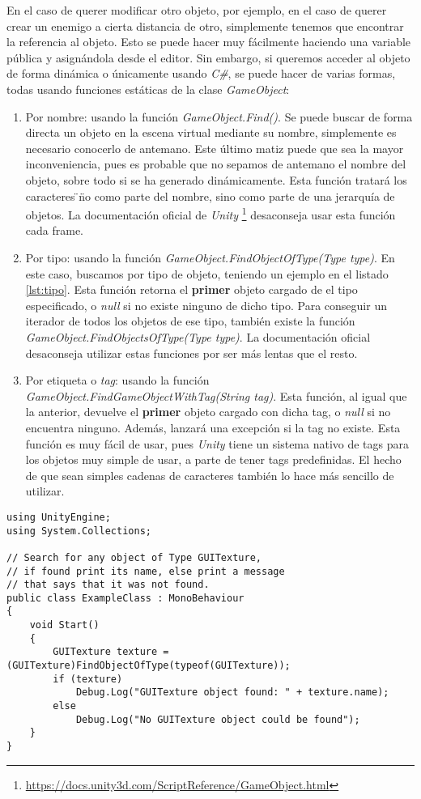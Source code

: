 \documentclass{pre-tfg}
\begin{document}
En el caso de querer modificar otro objeto, por ejemplo, en el caso de querer crear un enemigo a cierta distancia de otro, simplemente tenemos que encontrar la referencia al objeto. Esto se puede hacer muy fácilmente haciendo una variable pública y asignándola desde el editor. Sin embargo, si queremos acceder al objeto de forma dinámica o únicamente usando \textit{C\#}, se puede hacer de varias formas, todas usando funciones estáticas de la clase \textit{GameObject}:

\begin{enumerate}
\item Por nombre: usando la función \textit{GameObject.Find()}. Se puede buscar de forma directa un objeto en la escena virtual mediante su nombre, simplemente es necesario conocerlo de antemano. Este último matiz puede que sea la mayor inconveniencia, pues es probable que no sepamos de antemano el nombre del objeto, sobre todo si se ha generado dinámicamente. Esta función tratará los caracteres \"\/\" no como parte del nombre, sino como parte de una jerarquía de objetos. La documentación oficial de \textit{Unity} \footnote{\url{https://docs.unity3d.com/ScriptReference/GameObject.html}} desaconseja usar esta función cada frame.
\item Por tipo: usando la función \textit{GameObject.FindObjectOfType(Type type)}. En este caso, buscamos por tipo de objeto, teniendo un ejemplo en el listado \ref{lst:tipo}.
 Esta función retorna el \textbf{primer} objeto cargado de el tipo especificado, o \textit{null} si no existe ninguno de dicho tipo. Para conseguir un iterador de todos los objetos de ese tipo, también existe la función \textit{GameObject.FindObjectsOfType(Type type)}. La documentación oficial desaconseja utilizar estas funciones por ser más lentas que el resto.
\item Por etiqueta o \textit{tag}: usando la función \textit{GameObject.FindGameObjectWithTag(String tag)}. Esta función, al igual que la anterior, devuelve el \textbf{primer} objeto cargado con dicha tag, o \textit{null} si no encuentra ninguno. Además, lanzará una excepción si la tag no existe. Esta función es muy fácil de usar, pues \textit{Unity} tiene un sistema nativo de tags para los objetos muy simple de usar, a parte de tener tags predefinidas. El hecho de que sean simples cadenas de caracteres también lo hace más sencillo de utilizar. 
\end{enumerate}

\begin{lstlisting}[float=htbp, caption=Búsqueda de objetos por tipo, label=lst:tipo]
using UnityEngine;
using System.Collections;

// Search for any object of Type GUITexture,
// if found print its name, else print a message
// that says that it was not found.
public class ExampleClass : MonoBehaviour
{
    void Start()
    {
        GUITexture texture = (GUITexture)FindObjectOfType(typeof(GUITexture));
        if (texture)
            Debug.Log("GUITexture object found: " + texture.name);
        else
            Debug.Log("No GUITexture object could be found");
    }
}
\end{lstlisting}
\end{document}
